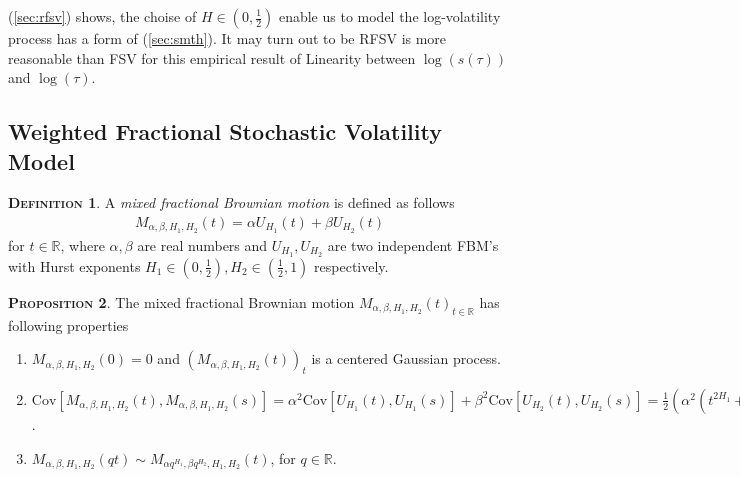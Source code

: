 \documentclass[a4paper, twoside, 11pt]{article}
\theoremstyle{definition}
\newtheorem{definition}{\scshape Definition}[section]
\newtheorem{proposition}[definition]{\scshape Proposition}
\newcommand{\brkt}[1]{\left({#1} \right)}
\begin{document}
(\ref{sec:rfsv}) shows, the choise of $H\in(0,\frac{1}{2})$ enable us to model the log-volatility process has a form of (\ref{sec:smth}). It may turn out to be RFSV is more reasonable than FSV for this empirical result of Linearity between $\log(s(\tau))$ and $\log(\tau)$.

\subsection{Weighted Fractional Stochastic Volatility Model}
\begin{definition}
  A \emph{mixed fractional Brownian motion} is defined as follows
\begin{eqnarray}
  M_{\alpha,\beta,H_1,H_2}(t) = \alpha U_{H_1}(t) + \beta U_{H_2}(t)
  \label{sec:mfsv}
\end{eqnarray}
for $t\in \mathbb{R}$, where $\alpha, \beta$ are real numbers and $U_{H_1}, U_{H_2}$ are two independent FBM's with Hurst exponents $H_1 \in (0, \frac{1}{2}), H_2 \in (\frac{1}{2}, 1)$ respectively.
\end{definition}

\begin{proposition}
  The mixed fractional Brownian motion $M_{\alpha,\beta,H_1,H_2}(t)_{t\in\mathbb{R}}$ has following properties
   \begin{enumerate}[topsep=0pt, itemsep=-1ex, partopsep=1ex, parsep=1ex, label=(\roman*)]
	 \item $M_{\alpha,\beta,H_1,H_2}(0) = 0$ and $(M_{\alpha,\beta,H_1,H_2}(t))_t$ is a centered Gaussian  process.
	 \item $\mathrm{Cov}[M_{\alpha,\beta,H_1,H_2}(t), M_{\alpha,\beta,H_1,H_2}(s)] = \alpha^2 \mathrm{Cov}[U_{H_1}(t), U_{H_1}(s)] + \beta^2\mathrm{Cov}[U_{H_2}(t), U_{H_2}(s)] = \frac{1}{2}\brkt{\alpha^2(t^{2H_1}+s^{2H_1}+|t-s|^{2H_1}) + \beta^2(t^{2H_2} + s^{2H_2} + |t-s|^{2H_2})}$. 
	 \item $M_{\alpha, \beta, H_1, H_2}(qt) \sim M_{\alpha q^{H_1}, \beta q^{H_2}, H_1, H_2}(t)$, for $q\in\mathbb{R}$.
	 \end{enumerate}
	 \label{sec:prop}
\end{proposition}
\end{document}
